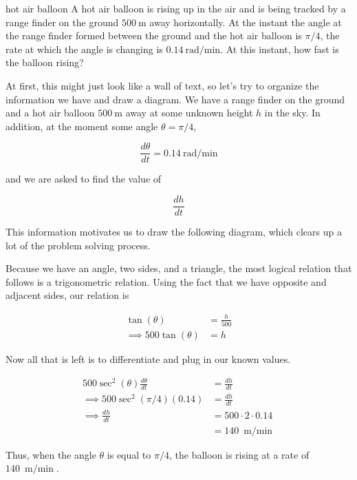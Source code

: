 \begin{examplebreak}{hot air balloon}
    A hot air balloon is rising up in the air and is being tracked by a range finder on the ground \( \SI{500}{\meter} \) away horizontally. At the instant the angle at the range finder formed between the ground and the hot air balloon is \( \pi / 4 \), the rate at which the angle is changing is \( \SI{0.14}{\radian\per\minute} \). At this instant, how fast is the balloon rising?

    \vspace{0.3cm}

    At first, this might just look like a wall of text, so let's try to organize the information we have and draw a diagram. We have a range finder on the ground and a hot air balloon \( \SI{500}{\meter} \) away at some unknown height \( h \) in the sky. In addition, at the moment some angle \( \theta = \pi/4 \),

    \[
        \frac{d\theta}{dt} = \SI{0.14}{\radian\per\minute}
    \]

    and we are asked to find the value of

    \[
        \frac{dh}{dt}
    \]

    This information motivates us to draw the following diagram, which clears up a lot of the problem solving process.

    \begin{figure}[H]
        \centering
        
    \end{figure}

    Because we have an angle, two sides, and a triangle, the most logical relation that follows is a trigonometric relation. Using the fact that we have opposite and adjacent sides, our relation is

    \begin{align*}
        \tan{\left( \theta \right)} &= \frac{h}{500} \\
        \implies 500 \tan{\left( \theta \right)} &= h
    \end{align*}

    Now all that is left is to differentiate and plug in our known values.

    \begin{align*}
        500 \sec^2{\left( \theta \right)} \frac{d\theta}{dt} &= \frac{dh}{dt} \\
        \implies 500 \sec^2{\left( \pi/4 \right)} \left( 0.14 \right) &= \frac{dh}{dt} \\
        \implies \frac{dh}{dt} &= 500 \cdot 2 \cdot 0.14 \\
        &= \SI{140}{\meter\per\min}
    \end{align*}

    Thus, when the angle \( \theta \) is equal to \( \pi/4 \), the balloon is rising at a rate of \( \SI{140}{\meter\per\min} \).
\end{examplebreak}

